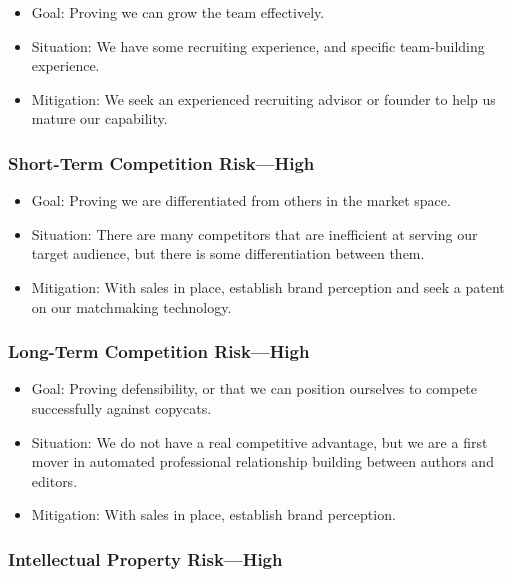 \documentclass[10pt,openany]{book}
\providecommand{\tightlist}{%
  \setlength{\itemsep}{0pt}\setlength{\parskip}{0pt}}
\begin{document}
\begin{itemize}
\tightlist
\item
  Goal: Proving we can grow the team effectively.
\item
  Situation: We have some recruiting experience, and specific
  team-building experience.
\item
  Mitigation: We seek an experienced recruiting advisor or founder to
  help us mature our capability.
\end{itemize}

\hypertarget{short-term-competition-riskhigh}{%
\subsubsection{Short-Term Competition
Risk---High}\label{short-term-competition-riskhigh}}

\begin{itemize}
\tightlist
\item
  Goal: Proving we are differentiated from others in the market space.
\item
  Situation: There are many competitors that are inefficient at serving
  our target audience, but there is some differentiation between them.
\item
  Mitigation: With sales in place, establish brand perception and seek a
  patent on our matchmaking technology.
\end{itemize}

\hypertarget{long-term-competition-riskhigh}{%
\subsubsection{Long-Term Competition
Risk---High}\label{long-term-competition-riskhigh}}

\begin{itemize}
\tightlist
\item
  Goal: Proving defensibility, or that we can position ourselves to
  compete successfully against copycats.
\item
  Situation: We do not have a real competitive advantage, but we are a
  first mover in automated professional relationship building between
  authors and editors.
\item
  Mitigation: With sales in place, establish brand perception.
\end{itemize}

\hypertarget{intellectual-property-riskhigh}{%
\subsubsection{Intellectual Property
Risk---High}\label{intellectual-property-riskhigh}}
\end{document}
